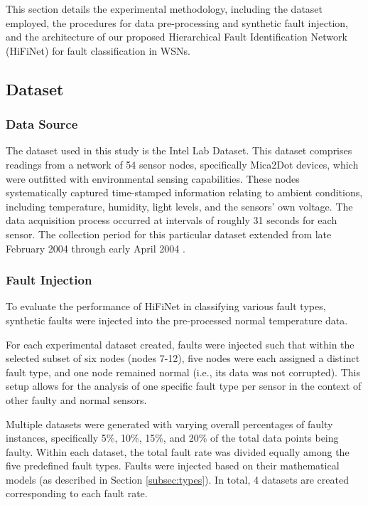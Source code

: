 This section details the experimental methodology, including the dataset employed, the procedures for data pre-processing and synthetic fault injection, and the architecture of our proposed Hierarchical Fault Identification Network (HiFiNet) for fault classification in WSNs.

\subsection{Dataset}
\subsubsection{Data Source}
The dataset used in this study is the Intel Lab Dataset. This dataset comprises readings from a network of 54 sensor nodes, specifically Mica2Dot devices, which were outfitted with environmental sensing capabilities. These nodes systematically captured time-stamped information relating to ambient conditions, including temperature, humidity, light levels, and the sensors' own voltage. The data acquisition process occurred at intervals of roughly 31 seconds for each sensor. The collection period for this particular dataset extended from late February 2004 through early April 2004 \cite{Intel2004}.

\subsubsection{Fault Injection}
To evaluate the performance of HiFiNet in classifying various fault types, synthetic faults were injected into the pre-processed normal temperature data. 

For each experimental dataset created, faults were injected such that within the selected subset of six nodes (nodes 7-12), five nodes were each assigned a distinct fault type, and one node remained normal (i.e., its data was not corrupted). This setup allows for the analysis of one specific fault type per sensor in the context of other faulty and normal sensors.

Multiple datasets were generated with varying overall percentages of faulty instances, specifically 5\%, 10\%, 15\%, and 20\% of the total data points being faulty. Within each dataset, the total fault rate was divided equally among the five predefined fault types. Faults were injected based on their mathematical models (as described in Section \ref{subsec:types}). In total, 4 datasets are created corresponding to each fault rate.

